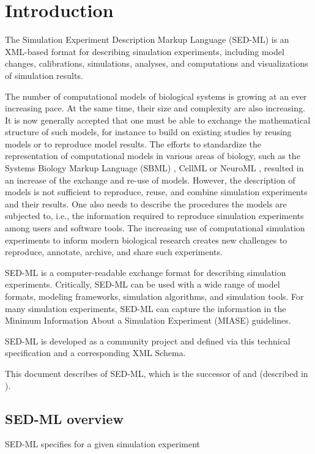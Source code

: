 \chapter{Introduction}
The Simulation Experiment Description Markup Language (SED-ML) is an XML-based format for describing simulation experiments, including model changes, calibrations, simulations, analyses, and computations and visualizations of simulation results.

The number of computational models of biological systems is growing at an ever increasing pace.
At the same time, their size and complexity are also increasing. It is now generally accepted that one must be able to exchange the mathematical structure of such models, for instance to build on existing studies by reusing models or to reproduce model results. The efforts to standardize the representation of computational models in various areas of biology, such as the Systems Biology Markup Language (SBML) \citep{Hucka:2003}, CellML \citep{cuellar:2003} or NeuroML \citep{Goddard:2001}, resulted in an increase of the exchange and re-use of models. However, the description of models is not sufficient to reproduce, reuse, and combine simulation experiments and their results. One also needs to describe the procedures the models are subjected to, i.e., the information required to reproduce simulation experiments among users and software tools. The increasing use of computational simulation experiments to inform modern biological research creates new challenges to reproduce, annotate, archive, and share such experiments.

SED-ML is a computer-readable exchange format for describing simulation experiments. Critically, SED-ML can be used with a wide range of model formats, modeling frameworks, simulation algorithms, and simulation tools. For many simulation experiments, SED-ML can capture the information in the Minimum Information About a Simulation Experiment (MIASE) \citep{Waltemath:2011} guidelines.

SED-ML is developed as a community project and defined via this technical specification and a corresponding XML Schema. 

This document describes \currentLV of SED-ML, which is the successor of \previousLV and \LoneVone (described in \citep{WAB+11}).

\section{SED-ML overview}
SED-ML specifies for a given simulation experiment

